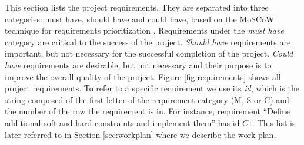 \documentclass{mprop}
\makeatletter
\theoremstyle{definition}
\newcommand{\specialcell}[2][c]{%
  \begin{tabular}[#1]{@{}c@{}}#2\end{tabular}}
\makeatother
\begin{document}
This section lists the project requirements. They are separated into three categories: must have, should have and could have, based on the MoSCoW technique for requirements prioritization \citep{ash2007moscow}. Requirements under the \textit{must have} category are critical to the success of the project. \textit{Should have} requirements are important, but not necessary for the successful completion of the project. \textit{Could have} requirements are desirable, but not necessary and their purpose is to improve the overall quality of the project. Figure \ref{fig:requirements} shows all project requirements. To refer to a specific requirement we use its \textit{id}, which is the string composed of the first letter of the requirement category (M, S or C) and the number of the row the requirement is in. For instance, requirement ``Define additional soft and hard constraints and implement them'' has id $C1$. This list is later referred to in Section \ref{sec:workplan} where we describe the work plan.

\end{document}
